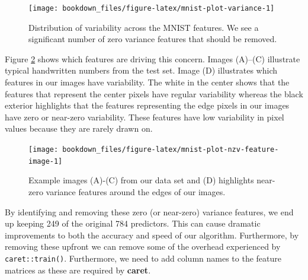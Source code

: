 \documentclass[]{krantz}
\makeatletter
\newenvironment{Shaded}{\begin{snugshade}}{\end{snugshade}}
\newcommand{\DataTypeTok}[1]{\textcolor[rgb]{0.27,0.27,0.27}{#1}}
\newcommand{\DecValTok}[1]{\textcolor[rgb]{0.06,0.06,0.06}{#1}}
\newcommand{\KeywordTok}[1]{\textcolor[rgb]{0.27,0.27,0.27}{\textbf{#1}}}
\newcommand{\NormalTok}[1]{#1}
\newcommand{\OperatorTok}[1]{\textcolor[rgb]{0.43,0.43,0.43}{\textbf{#1}}}
\newcommand{\StringTok}[1]{\textcolor[rgb]{0.5,0.5,0.5}{#1}}
\newenvironment{kframe}{%
\medskip{}
\setlength{\fboxsep}{.8em}
 \def\at@end@of@kframe{}%
 \ifinner\ifhmode%
  \def\at@end@of@kframe{\end{minipage}}%
  \begin{minipage}{\columnwidth}%
 \fi\fi%
 \def\FrameCommand##1{\hskip\@totalleftmargin \hskip-\fboxsep
 \colorbox{shadecolor}{##1}\hskip-\fboxsep
     \hskip-\linewidth \hskip-\@totalleftmargin \hskip\columnwidth}%
 \MakeFramed {\advance\hsize-\width
   \@totalleftmargin\z@ \linewidth\hsize
   \@setminipage}}%
 {\par\unskip\endMakeFramed%
 \at@end@of@kframe}
\renewenvironment{Shaded}{\begin{kframe}}{\end{kframe}}
\makeatother
\begin{document}
\begin{Shaded}
\end{Shaded}

\begin{figure}

{\centering \texttt{[image: bookdown\_files/figure-latex/mnist-plot-variance-1]} 

}

\caption{Distribution of variability across the MNIST features.  We see a significant number of zero variance features that should be removed.}\label{fig:mnist-plot-variance}
\end{figure}

Figure \ref{fig:mnist-plot-nzv-feature-image} shows which features are driving this concern. Images (A)--(C) illustrate typical handwritten numbers from the test set. Image (D) illustrates which features in our images have variability. The white in the center shows that the features that represent the center pixels have regular variability whereas the black exterior highlights that the features representing the edge pixels in our images have zero or near-zero variability. These features have low variability in pixel values because they are rarely drawn on.

\begin{figure}

{\centering \texttt{[image: bookdown\_files/figure-latex/mnist-plot-nzv-feature-image-1]} 

}

\caption{Example images (A)-(C) from our data set and (D) highlights near-zero variance features around the edges of our images.}\label{fig:mnist-plot-nzv-feature-image}
\end{figure}

By identifying and removing these zero (or near-zero) variance features, we end up keeping 249 of the original 784 predictors. This can cause dramatic improvements to both the accuracy and speed of our algorithm. Furthermore, by removing these upfront we can remove some of the overhead experienced by \texttt{caret::train()}. Furthermore, we need to add column names to the feature matrices as these are required by \textbf{caret}.
\end{document}
